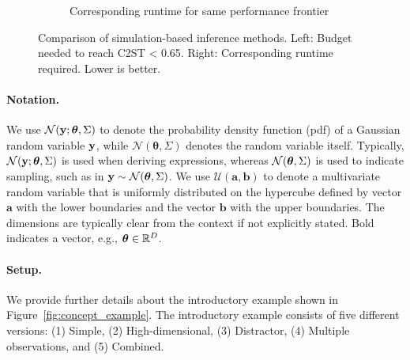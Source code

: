 \begin{figure}
\begin{subfigure}[b]{0.45\textwidth}
\caption{Corresponding runtime for same performance frontier}
\end{subfigure}
\caption{Comparison of simulation-based inference methods. Left: Budget needed to reach C2ST < 0.65. Right: Corresponding runtime required. Lower is better.}
\end{figure}


\paragraph{Notation.}

We use $\mathcal{N}(\mathbf{y}; \boldsymbol{\theta}, \Sigma)$ to denote the probability density function (pdf) of a Gaussian random variable $\mathbf{y}$, while $\mathcal{N}(\boldsymbol{\theta}, \Sigma)$ denotes the random variable itself. Typically, $\mathcal{N}(\mathbf{y}; \boldsymbol{\theta}, \Sigma)$ is used when deriving expressions, whereas $\mathcal{N}(\boldsymbol{\theta}, \Sigma)$ is used to indicate sampling, such as in $\mathbf{y} \sim \mathcal{N}(\boldsymbol{\theta}, \Sigma)$. We use $\mathcal{U}(\mathbf{a}, \mathbf{b})$ to denote a multivariate random variable that is uniformly distributed on the hypercube defined by vector $\mathbf{a}$ with the lower boundaries and the vector $\mathbf{b}$ with the upper boundaries. The dimensions are typically clear from the context if not explicitly stated. Bold indicates a vector, e.g., $\boldsymbol{\theta} \in \mathbb{R}^D$.

\paragraph{Setup.}

We provide further details about the introductory example shown in Figure~\ref{fig:concept_example}.
The introductory example consists of five different versions:
(1) Simple,
(2) High-dimensional,
(3) Distractor,
(4) Multiple observations, and
(5) Combined.

